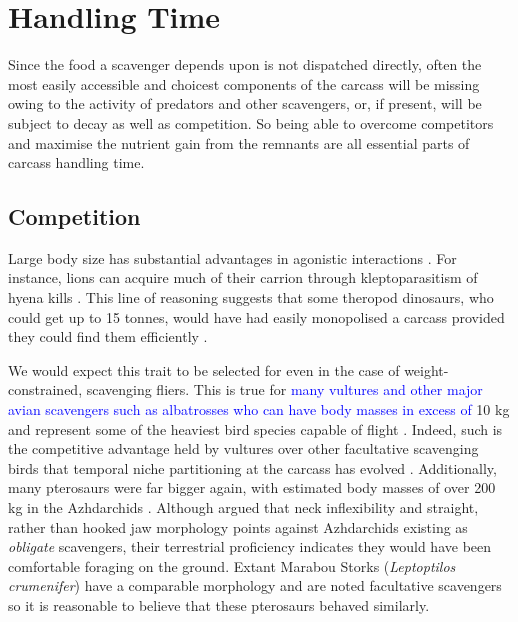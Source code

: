 \documentclass[a4paper,12pt]{article}
\begin{document}
\section{Handling Time}
\label{handlingTime}
Since the food a scavenger depends upon is not dispatched directly, often the most easily accessible and choicest components of the carcass will be missing owing to the activity of predators and other scavengers, or, if present, will be subject to decay as well as competition.
So being able to overcome competitors and maximise the nutrient gain from the remnants are all essential parts of carcass handling time. 

\subsection{Competition}
Large body size has substantial advantages in agonistic interactions \textcolor{blue}{\citep{ruxton2004obligate,moleon2014inter,pereira2014facultative}}. 
For instance, lions can acquire much of their carrion through kleptoparasitism of hyena kills \textcolor{blue}{\citep{trinkel2005competitive,pereira2014facultative,periquet2015lion}}. 
This line of reasoning suggests that some theropod dinosaurs, who could get up to 15 tonnes, would have had easily monopolised a carcass \citep{weishampel2004dinosauria} provided they could find them efficiently \citep{kane2016body}. 

We would expect this trait to be selected for even in the case of weight-constrained, scavenging fliers.
This is true for \textcolor{blue}{many vultures and other major avian scavengers such as albatrosses who can have body masses in excess of} 10 kg and represent some of the heaviest bird species capable of flight \citep{weimerskirch1992reproductive,ferguson2001raptors,donazar2002effects}.
Indeed, such is the competitive advantage held by vultures over other facultative scavenging birds that temporal niche partitioning at the carcass has evolved \textcolor{blue}{\citep{kendall2013alternative,KaneVul,moreno2016behavioral}}. 
Additionally, many pterosaurs were far bigger again, with estimated body masses of over 200 kg in the Azhdarchids \citep{witton2010size}.
Although \cite{witton2008reappraisal} argued that neck inflexibility and straight, rather than hooked jaw morphology points against Azhdarchids existing as \textit{obligate} scavengers, their terrestrial proficiency indicates they would have been comfortable foraging on the ground.
Extant Marabou Storks (\textit{Leptoptilos crumenifer}) have a comparable morphology and are noted facultative scavengers \citep{monadjem2012survival} so it is reasonable to believe that these pterosaurs behaved similarly.
\end{document}
